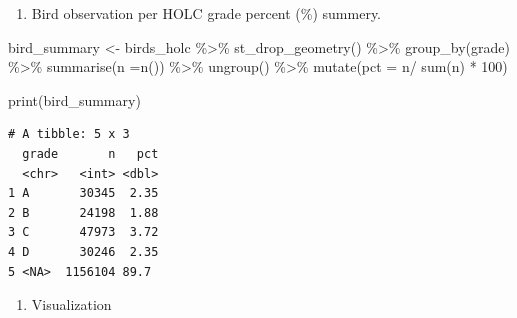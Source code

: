 \documentclass[
  letterpaper,
  DIV=11,
  numbers=noendperiod]{scrartcl}
\newenvironment{Shaded}{\begin{snugshade}}{\end{snugshade}}
\newcommand{\AttributeTok}[1]{\textcolor[rgb]{0.40,0.45,0.13}{#1}}
\newcommand{\DecValTok}[1]{\textcolor[rgb]{0.68,0.00,0.00}{#1}}
\newcommand{\FunctionTok}[1]{\textcolor[rgb]{0.28,0.35,0.67}{#1}}
\newcommand{\NormalTok}[1]{\textcolor[rgb]{0.00,0.23,0.31}{#1}}
\newcommand{\OtherTok}[1]{\textcolor[rgb]{0.00,0.23,0.31}{#1}}
\newcommand{\SpecialCharTok}[1]{\textcolor[rgb]{0.37,0.37,0.37}{#1}}
\providecommand{\tightlist}{%
  \setlength{\itemsep}{0pt}\setlength{\parskip}{0pt}}\usepackage{longtable,booktabs,array}
\begin{document}
\begin{enumerate}
\def\labelenumi{\arabic{enumi}.}
\setcounter{enumi}{2}
\tightlist
\item
  Bird observation per HOLC grade percent (\%) summery.
\end{enumerate}

\begin{Shaded}
\begin{Highlighting}[]
\NormalTok{bird\_summary }\OtherTok{\textless{}{-}}\NormalTok{ birds\_holc }\SpecialCharTok{\%\textgreater{}\%} 
  \FunctionTok{st\_drop\_geometry}\NormalTok{() }\SpecialCharTok{\%\textgreater{}\%} 
  \FunctionTok{group\_by}\NormalTok{(grade) }\SpecialCharTok{\%\textgreater{}\%} 
  \FunctionTok{summarise}\NormalTok{(}\AttributeTok{n =}\FunctionTok{n}\NormalTok{()) }\SpecialCharTok{\%\textgreater{}\%} 
  \FunctionTok{ungroup}\NormalTok{() }\SpecialCharTok{\%\textgreater{}\%} 
  \FunctionTok{mutate}\NormalTok{(}\AttributeTok{pct =}\NormalTok{ n}\SpecialCharTok{/} \FunctionTok{sum}\NormalTok{(n) }\SpecialCharTok{*} \DecValTok{100}\NormalTok{)}

\FunctionTok{print}\NormalTok{(bird\_summary)}
\end{Highlighting}
\end{Shaded}

\begin{verbatim}
# A tibble: 5 x 3
  grade       n   pct
  <chr>   <int> <dbl>
1 A       30345  2.35
2 B       24198  1.88
3 C       47973  3.72
4 D       30246  2.35
5 <NA>  1156104 89.7 
\end{verbatim}

\begin{enumerate}
\def\labelenumi{\arabic{enumi}.}
\setcounter{enumi}{3}
\tightlist
\item
  Visualization
\end{enumerate}
\end{document}
